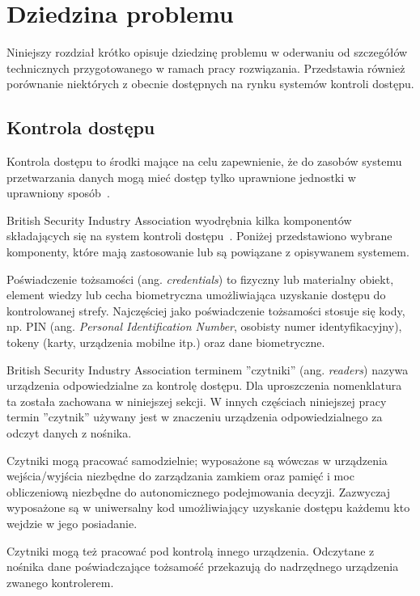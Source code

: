 \chapter{Dziedzina problemu}
\label{chap:problem-domain}

	Niniejszy rozdział krótko opisuje dziedzinę problemu w oderwaniu od szczegółów technicznych przygotowanego w ramach pracy rozwiązania. Przedstawia również porównanie niektórych z obecnie dostępnych na rynku systemów kontroli dostępu.

	\section{Kontrola dostępu}

		Kontrola dostępu to środki mające na celu zapewnienie, że do zasobów systemu przetwarzania danych mogą mieć dostęp tylko uprawnione jednostki w uprawniony sposób~\cite{pkn2002}.

		British Security Industry Association wyodrębnia kilka komponentów składających się na system kontroli dostępu~\cite{bsia2016}. Poniżej przedstawiono wybrane komponenty, które mają zastosowanie lub są powiązane z opisywanem systemem.

		Poświadczenie tożsamości (ang. \textit{credentials}) to fizyczny lub materialny obiekt, element wiedzy lub cecha biometryczna umożliwiająca uzyskanie dostępu do kontrolowanej strefy. Najczęściej jako poświadczenie tożsamości stosuje się kody, np. PIN (ang. \textit{Personal Identification Number}, osobisty numer identyfikacyjny), tokeny (karty, urządzenia mobilne itp.) oraz dane biometryczne.~\cite{bsia2016}

		British Security Industry Association terminem ''czytniki'' (ang. \textit{readers}) nazywa urządzenia odpowiedzialne za kontrolę dostępu. Dla uproszczenia nomenklatura ta została zachowana w niniejszej sekcji. W innych częściach niniejszej pracy termin ''czytnik'' używany jest w znaczeniu urządzenia odpowiedzialnego za odczyt danych z nośnika.

		Czytniki mogą pracować samodzielnie; wyposażone są wówczas w urządzenia wejścia/wyjścia niezbędne do zarządzania zamkiem oraz pamięć i moc obliczeniową niezbędne do autonomicznego podejmowania decyzji. Zazwyczaj wyposażone są w uniwersalny kod umożliwiający uzyskanie dostępu każdemu kto wejdzie w jego posiadanie.~\cite{bsia2016}

		Czytniki mogą też pracować pod kontrolą innego urządzenia. Odczytane z nośnika dane poświadczające tożsamość przekazują do nadrzędnego urządzenia zwanego kontrolerem.~\cite{bsia2016}

